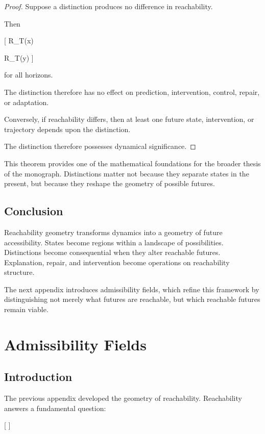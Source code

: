 \documentclass[11pt,oneside,openany]{book}
\begin{document}
\begin{proof}

Suppose a distinction produces no difference in reachability.

Then

[
R_T(x)

R_T(y)
]

for all horizons.

The distinction therefore has no effect on prediction, intervention, control, repair, or adaptation.

Conversely, if reachability differs, then at least one future state, intervention, or trajectory depends upon the distinction.

The distinction therefore possesses dynamical significance.

\end{proof}

This theorem provides one of the mathematical foundations for the broader thesis of the monograph. Distinctions matter not because they separate states in the present, but because they reshape the geometry of possible futures.

\section{Conclusion}

Reachability geometry transforms dynamics into a geometry of future accessibility. States become regions within a landscape of possibilities. Distinctions become consequential when they alter reachable futures. Explanation, repair, and intervention become operations on reachability structure.

The next appendix introduces admissibility fields, which refine this framework by distinguishing not merely what futures are reachable, but which reachable futures remain viable.

\chapter{Admissibility Fields}

\section{Introduction}

The previous appendix developed the geometry of reachability. Reachability answers a fundamental question:

[
]
\end{document}

